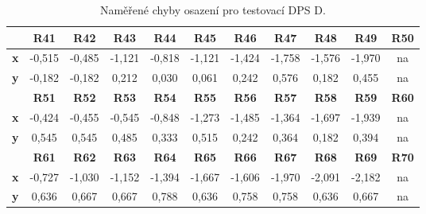 \begin{table}[H]
  \caption{Naměřené chyby osazení pro testovací DPS D.}
  \begin{center}
  	\small
	  \begin{tabular}{|c|c|c|c|c|c|c|c|c|c|c|}
	    \hline
			& \textbf{R41}	& \textbf{R42}	& \textbf{R43}	& \textbf{R44}	& \textbf{R45}	& \textbf{R46}	& \textbf{R47}	& \textbf{R48}	& \textbf{R49}	& \textbf{R50}  \\
	    \hline
	    \textbf{x}	& -0,515&	-0,485&	-1,121&	-0,818&	-1,121&	-1,424&	-1,758&	-1,576&	-1,970&	na \\
	    \hline
	    \textbf{y}	&-0,182&	-0,182&	0,212&	0,030&	0,061&	0,242&	0,576&	0,182&	0,455&	na \\
	    \hline
			& \textbf{R51}	& \textbf{R52}	& \textbf{R53}	& \textbf{R54}	& \textbf{R55}	& \textbf{R56}	& \textbf{R57}	& \textbf{R58}	& \textbf{R59}	& \textbf{R60}  \\
	    \hline
	    \textbf{x}	& -0,424&	-0,455&	-0,545&	-0,848&	-1,273&	-1,485&	-1,364&	-1,697&	-1,939&	na  \\
	    \hline
	    \textbf{y}	& 0,545&	0,545&	0,485&	0,333&	0,515&	0,242&	0,364&	0,182&	0,394&	na \\
	    \hline
	    		& \textbf{R61}	& \textbf{R62}	& \textbf{R63}	& \textbf{R64}	& \textbf{R65}	& \textbf{R66}	& \textbf{R67}	& \textbf{R68}	& \textbf{R69}	& \textbf{R70}  \\
	    \hline
	    \textbf{x}	& -0,727&	-1,030&	-1,152&	-1,394&	-1,667&	-1,606&	-1,970&	-2,091&	-2,182&	na \\
	    \hline
	    \textbf{y}	& 0,636&	0,667&	0,667&	0,788&	0,636&	0,758&	0,758&	0,636&	0,667&	na \\
	    \hline

	  \end{tabular}

  \end{center}

\end{table}







